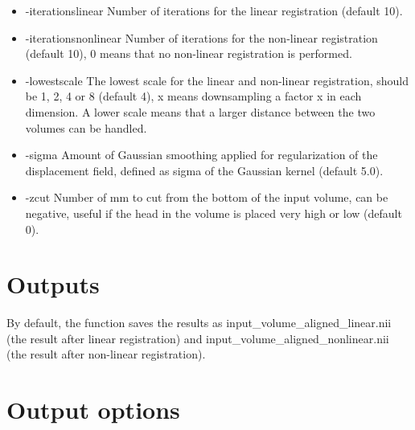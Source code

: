 \begin{itemize}

\item -iterationslinear          
\newline \newline Number of iterations for the linear registration (default 10). 

\newpage

\item -iterationsnonlinear       
\newline \newline Number of iterations for the non-linear registration (default 10), 0 means that no non-linear registration is performed. 

\item -lowestscale               
\newline \newline The lowest scale for the linear and non-linear registration, should be 1, 2, 4 or 8 (default 4), x means downsampling a factor x in each dimension. A lower scale means that a larger distance between the two volumes can be handled.

\item -sigma                    
\newline \newline Amount of Gaussian smoothing applied for regularization of the displacement field, defined as sigma of the Gaussian kernel (default 5.0).

\item -zcut                      
\newline \newline Number of mm to cut from the bottom of the input volume, can be negative, useful if the head in the volume is placed very high or low (default 0). 

\end{itemize}

\section{Outputs}

By default, the function saves the results as input\_volume\_aligned\_linear.nii (the result after linear registration) and input\_volume\_aligned\_nonlinear.nii (the result after non-linear registration). 

\newpage 

\section{Output options}

